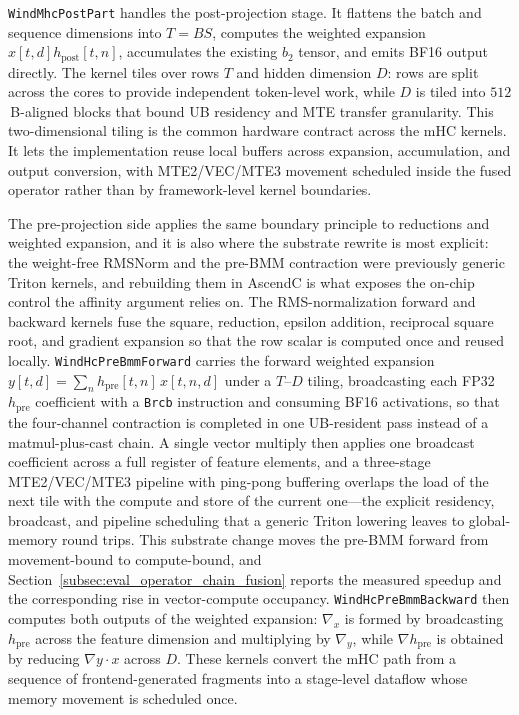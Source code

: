 \texttt{WindMhcPostPart} handles the post-projection stage. It flattens the batch and sequence dimensions into $T=BS$, computes the weighted expansion $x[t,d]h_{\mathrm{post}}[t,n]$, accumulates the existing $b_2$ tensor, and emits BF16 output directly. The kernel tiles over rows $T$ and hidden dimension $D$: rows are split across the cores to provide independent token-level work, while $D$ is tiled into $512$\,B-aligned blocks that bound UB residency and MTE transfer granularity. This two-dimensional tiling is the common hardware contract across the mHC kernels. It lets the implementation reuse local buffers across expansion, accumulation, and output conversion, with MTE2/VEC/MTE3 movement scheduled inside the fused operator rather than by framework-level kernel boundaries.

The pre-projection side applies the same boundary principle to reductions and weighted expansion, and it is also where the substrate rewrite is most explicit: the weight-free RMSNorm and the pre-BMM contraction were previously generic Triton kernels, and rebuilding them in AscendC is what exposes the on-chip control the affinity argument relies on. The RMS-normalization forward and backward kernels fuse the square, reduction, epsilon addition, reciprocal square root, and gradient expansion so that the row scalar is computed once and reused locally. \texttt{WindHcPreBmmForward} carries the forward weighted expansion $y[t,d]=\sum_{n} h_{\mathrm{pre}}[t,n]\,x[t,n,d]$ under a $T$--$D$ tiling, broadcasting each FP32 $h_{\mathrm{pre}}$ coefficient with a \texttt{Brcb} instruction and consuming BF16 activations, so that the four-channel contraction is completed in one UB-resident pass instead of a matmul-plus-cast chain. A single vector multiply then applies one broadcast coefficient across a full register of feature elements, and a three-stage MTE2/VEC/MTE3 pipeline with ping-pong buffering overlaps the load of the next tile with the compute and store of the current one---the explicit residency, broadcast, and pipeline scheduling that a generic Triton lowering leaves to global-memory round trips. This substrate change moves the pre-BMM forward from movement-bound to compute-bound, and Section~\ref{subsec:eval_operator_chain_fusion} reports the measured speedup and the corresponding rise in vector-compute occupancy. \texttt{WindHcPreBmmBackward} then computes both outputs of the weighted expansion: $\nabla_x$ is formed by broadcasting $h_{\mathrm{pre}}$ across the feature dimension and multiplying by $\nabla_y$, while $\nabla h_{\mathrm{pre}}$ is obtained by reducing $\nabla y\cdot x$ across $D$. These kernels convert the mHC path from a sequence of frontend-generated fragments into a stage-level dataflow whose memory movement is scheduled once.

